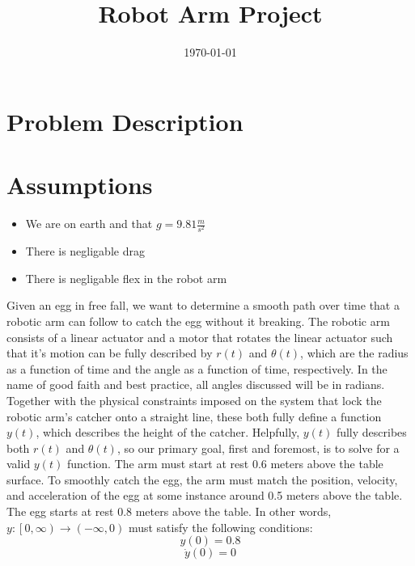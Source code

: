 \documentclass[nofoot,pdf-a,balance,upint,subscriptcorrection,varvw,mathalfa=cal=boondoxo]{asmeconf}
\title{Robot Arm Project}
\date{\today}
\begin{document}
    \maketitle
    \section*{Problem Description}
     
	\section*{Assumptions}
	
	\begin{itemize}
		\item We are on earth and that $g = 9.81 \frac{m}{s^2}$
		\item There is negligable drag
		\item There is negligable flex in the robot arm
	\end{itemize}
	
    \tab Given an egg in free fall, we want to determine a smooth path over time that a robotic arm can follow to catch the egg without it breaking. The robotic arm consists of a linear actuator and a motor that rotates the linear actuator such that it's motion can be fully described by $r\left(t\right)$ and $\theta\left(t\right)$, which are the radius as a function of time and the angle as a function of time, respectively. In the name of good faith and best practice, all angles discussed will be in radians. Together with the physical constraints imposed on the system that lock the robotic arm's catcher onto a straight line, these both fully define a function $y\left(t\right)$, which describes the height of the catcher. Helpfully, $y\left(t\right)$ fully describes both $r\left(t\right)$ and $\theta\left(t\right)$, so our primary goal, first and foremost, is to solve for a valid $y\left(t\right)$ function. The arm must start at rest 0.6 meters above the table surface. To smoothly catch the egg, the arm must match the position, velocity, and acceleration of the egg at some instance around 0.5 meters above the table. The egg starts at rest 0.8 meters above the table.\newline \newline 
    In other words, $y: \left[0, \infty\right) \to \left(-\infty, 0\right)
$ must satisfy the following conditions:
    \begin{equation}
        y\left(0\right) = 0.8
    \end{equation}
    \begin{equation}
        \dot{y}\left(0\right) = 0
    \end{equation}
	
\end{document}
